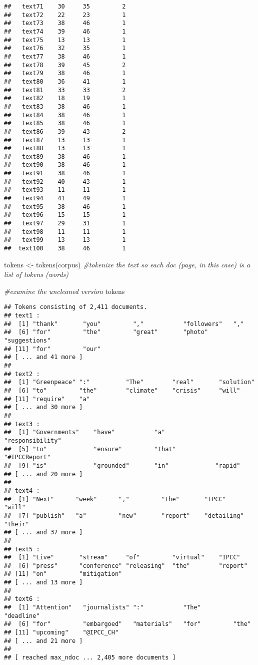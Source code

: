 \documentclass[
]{article}
\newenvironment{Shaded}{\begin{snugshade}}{\end{snugshade}}
\newcommand{\CommentTok}[1]{\textcolor[rgb]{0.56,0.35,0.01}{\textit{#1}}}
\newcommand{\FunctionTok}[1]{\textcolor[rgb]{0.00,0.00,0.00}{#1}}
\newcommand{\NormalTok}[1]{#1}
\newcommand{\OtherTok}[1]{\textcolor[rgb]{0.56,0.35,0.01}{#1}}
\begin{document}
\begin{verbatim}
##   text71    30     35         2
##   text72    22     23         1
##   text73    38     46         1
##   text74    39     46         1
##   text75    13     13         1
##   text76    32     35         1
##   text77    38     46         1
##   text78    39     45         2
##   text79    38     46         1
##   text80    36     41         1
##   text81    33     33         2
##   text82    18     19         1
##   text83    38     46         1
##   text84    38     46         1
##   text85    38     46         1
##   text86    39     43         2
##   text87    13     13         1
##   text88    13     13         1
##   text89    38     46         1
##   text90    38     46         1
##   text91    38     46         1
##   text92    40     43         1
##   text93    11     11         1
##   text94    41     49         1
##   text95    38     46         1
##   text96    15     15         1
##   text97    29     31         1
##   text98    11     11         1
##   text99    13     13         1
##  text100    38     46         1
\end{verbatim}

\begin{Shaded}
\begin{Highlighting}[]
\NormalTok{tokens }\OtherTok{\textless{}{-}} \FunctionTok{tokens}\NormalTok{(corpus) }\CommentTok{\#tokenize the text so each doc (page, in this case) is a list of tokens (words)}

\CommentTok{\#examine the uncleaned version}
\NormalTok{tokens}
\end{Highlighting}
\end{Shaded}

\begin{verbatim}
## Tokens consisting of 2,411 documents.
## text1 :
##  [1] "thank"       "you"         ","           "followers"   ","          
##  [6] "for"         "the"         "great"       "photo"       "suggestions"
## [11] "for"         "our"        
## [ ... and 41 more ]
## 
## text2 :
##  [1] "Greenpeace" ":"          "The"        "real"       "solution"  
##  [6] "to"         "the"        "climate"    "crisis"     "will"      
## [11] "require"    "a"         
## [ ... and 30 more ]
## 
## text3 :
##  [1] "Governments"    "have"           "a"              "responsibility"
##  [5] "to"             "ensure"         "that"           "#IPCCReport"   
##  [9] "is"             "grounded"       "in"             "rapid"         
## [ ... and 20 more ]
## 
## text4 :
##  [1] "Next"      "week"      ","         "the"       "IPCC"      "will"     
##  [7] "publish"   "a"         "new"       "report"    "detailing" "their"    
## [ ... and 37 more ]
## 
## text5 :
##  [1] "Live"       "stream"     "of"         "virtual"    "IPCC"      
##  [6] "press"      "conference" "releasing"  "the"        "report"    
## [11] "on"         "mitigation"
## [ ... and 13 more ]
## 
## text6 :
##  [1] "Attention"   "journalists" ":"           "The"         "deadline"   
##  [6] "for"         "embargoed"   "materials"   "for"         "the"        
## [11] "upcoming"    "@IPCC_CH"   
## [ ... and 21 more ]
## 
## [ reached max_ndoc ... 2,405 more documents ]
\end{verbatim}
\end{document}
